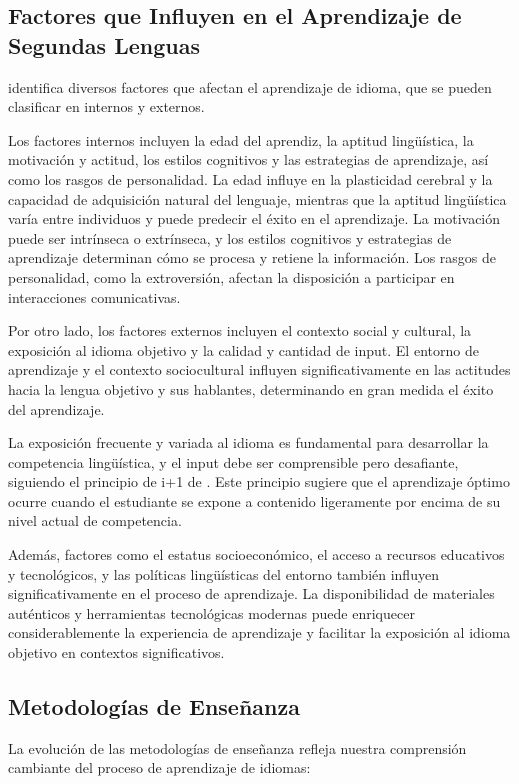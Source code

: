 \subsection{Factores que Influyen en el Aprendizaje de Segundas Lenguas}

\cite{ellis1994study} identifica diversos factores que afectan el aprendizaje de idioma, que se pueden clasificar en internos y externos.

Los factores internos incluyen la edad del aprendiz, la aptitud lingüística, la motivación y actitud, los estilos cognitivos y las estrategias de aprendizaje, así como los rasgos de personalidad. La edad influye en la plasticidad cerebral y la capacidad de adquisición natural del lenguaje, mientras que la aptitud lingüística varía entre individuos y puede predecir el éxito en el aprendizaje. La motivación puede ser intrínseca o extrínseca, y los estilos cognitivos y estrategias de aprendizaje determinan cómo se procesa y retiene la información. Los rasgos de personalidad, como la extroversión, afectan la disposición a participar en interacciones comunicativas.

Por otro lado, los factores externos incluyen el contexto social y cultural, la exposición al idioma objetivo y la calidad y cantidad de input. El entorno de aprendizaje y el contexto sociocultural influyen significativamente en las actitudes hacia la lengua objetivo y sus hablantes, determinando en gran medida el éxito del aprendizaje.

La exposición frecuente y variada al idioma es fundamental para desarrollar la competencia lingüística, y el input debe ser comprensible pero desafiante, siguiendo el principio de i+1 de \cite{krashen1982principles}. Este principio sugiere que el aprendizaje óptimo ocurre cuando el estudiante se expone a contenido ligeramente por encima de su nivel actual de competencia.

Además, factores como el estatus socioeconómico, el acceso a recursos educativos y tecnológicos, y las políticas lingüísticas del entorno también influyen significativamente en el proceso de aprendizaje. La disponibilidad de materiales auténticos y herramientas tecnológicas modernas puede enriquecer considerablemente la experiencia de aprendizaje y facilitar la exposición al idioma objetivo en contextos significativos.

\subsection{Metodologías de Enseñanza}
La evolución de las metodologías de enseñanza refleja nuestra comprensión cambiante del proceso de aprendizaje de idiomas:

